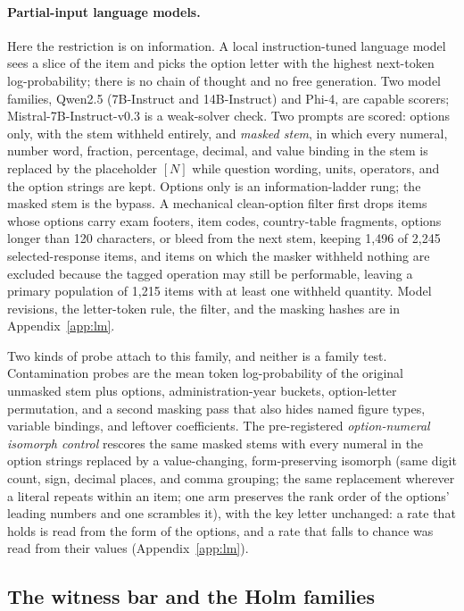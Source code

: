 \paragraph{Partial-input language models.}
Here the restriction is on information. A local instruction-tuned language model sees a slice of the item and picks the option letter with the highest next-token log-probability; there is no chain of thought and no free generation. Two model families, Qwen2.5 (7B-Instruct and 14B-Instruct) and Phi-4, are capable scorers; Mistral-7B-Instruct-v0.3 is a weak-solver check. Two prompts are scored: options only, with the stem withheld entirely, and \emph{masked stem}, in which every numeral, number word, fraction, percentage, decimal, and value binding in the stem is replaced by the placeholder $[N]$ while question wording, units, operators, and the option strings are kept. Options only is an information-ladder rung; the masked stem is the bypass. A mechanical clean-option filter first drops items whose options carry exam footers, item codes, country-table fragments, options longer than 120 characters, or bleed from the next stem, keeping 1{,}496 of 2{,}245 selected-response items, and items on which the masker withheld nothing are excluded because the tagged operation may still be performable, leaving a primary population of 1{,}215 items with at least one withheld quantity. Model revisions, the letter-token rule, the filter, and the masking hashes are in Appendix~\ref{app:lm}.

Two kinds of probe attach to this family, and neither is a family test. Contamination probes are the mean token log-probability of the original unmasked stem plus options, administration-year buckets, option-letter permutation, and a second masking pass that also hides named figure types, variable bindings, and leftover coefficients. The pre-registered \emph{option-numeral isomorph control} rescores the same masked stems with every numeral in the option strings replaced by a value-changing, form-preserving isomorph (same digit count, sign, decimal places, and comma grouping; the same replacement wherever a literal repeats within an item; one arm preserves the rank order of the options' leading numbers and one scrambles it), with the key letter unchanged: a rate that holds is read from the form of the options, and a rate that falls to chance was read from their values (Appendix~\ref{app:lm}).

\subsection{The witness bar and the Holm families}
\label{sec:bar}

